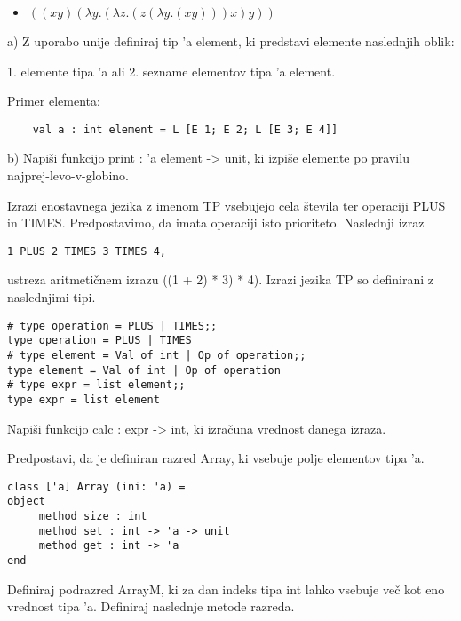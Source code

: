 \begin{ex}
 \begin{itemize}
 \item $((xy)(\lambda y.(\lambda z.(z(\lambda y.(xy)))x)y)) $
 \end{itemize}


\end{ex} \begin{ex}
a) Z uporabo unije definiraj tip 'a element, ki predstavi elemente naslednjih oblik:

    1. elemente tipa 'a ali
    2. sezname elementov tipa 'a element.

    Primer elementa: 
\begin{verbatim}
    val a : int element = L [E 1; E 2; L [E 3; E 4]]
\end{verbatim}

b) Napi\v si funkcijo print : 'a element -> unit, ki izpi\v se elemente po pravilu                          
    najprej-levo-v-globino.



\end{ex} \begin{ex}
Izrazi enostavnega jezika z imenom TP vsebujejo cela \v stevila ter operaciji PLUS in TIMES. Predpostavimo, da imata operaciji isto prioriteto. Naslednji izraz
\begin{verbatim}
1 PLUS 2 TIMES 3 TIMES 4,
\end{verbatim}
ustreza aritmeti\v cnem izrazu ((1 + 2) * 3) * 4). Izrazi jezika TP so definirani z naslednjimi tipi. 
 
\begin{verbatim}
# type operation = PLUS | TIMES;; 
type operation = PLUS | TIMES 
# type element = Val of int | Op of operation;; 
type element = Val of int | Op of operation
# type expr = list element;;
type expr = list element

\end{verbatim}
Napi\v si funkcijo calc : expr -> int, ki izra\v cuna vrednost danega izraza.  


\end{ex} \begin{ex}
Predpostavi, da je definiran razred Array, ki vsebuje polje elementov tipa 'a. 

\begin{verbatim}
class ['a] Array (ini: 'a) =
object 
     method size : int
     method set : int -> 'a -> unit
     method get : int -> 'a
end
\end{verbatim}
Definiraj podrazred ArrayM, ki za dan indeks tipa int lahko vsebuje ve\v c kot eno vrednost tipa 'a.  Definiraj naslednje metode razreda. 


\end{ex}
